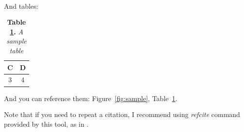\\
And tables:
\begin{table}[H]
	\centering
	\caption{\textbf{Table \ref{tab:sample}.} \textit{A sample table}}
	\begin{tabular}{|c|c|}
		\hline
		C & D \\ \hline
		3 & 4 \\ \hline
	\end{tabular}
	\label{tab:sample}
\end{table}

And you can reference them: Figure~\ref{fig:sample}, Table~\ref{tab:sample}.

Note that if you need to repeat a citation, I recommend using \textit{refcite} command provided by this tool, as in .


